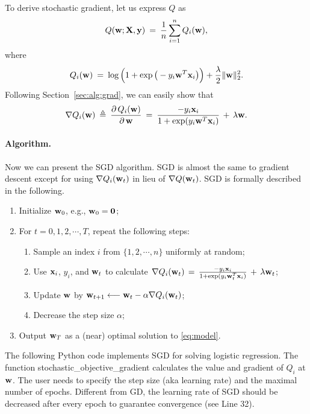 \documentclass[11pt]{article}
\numberwithin{equation}{section}
\def\w{{\bf w}}
\def\X{{\bf X}}
\def\x{{\bf x}}
\def\y{{\bf y}}
\def\0{{\bf 0}}
\begin{document}
To derive stochastic gradient, let us express $Q $ as 
\begin{equation}\label{eq:sgrad1}
Q (\w; \X, \y) \: = \: \frac{1}{n} \sum_{i=1}^n Q_i(\w)  ,
\end{equation}
where
\begin{equation*}
Q_i (\w) \: = \: \log \Big( 1 + \exp \big( - y_i \w^T \x_i \big) \Big) + \frac{\lambda}{2} \|\w \|_2^2 .
\end{equation*}
Following Section~\ref{sec:alg:grad}, we can easily show that
\begin{equation} \label{eq:sgrad2}
\nabla Q_i (\w) \: \triangleq \:
\frac{ \partial \, Q_i (\w ) }{\partial \, \w }
\: = \:
\frac{ - y_i \x_i }{1+\exp({y_i \w^T \x_i})} \, + \, \lambda \w .
\end{equation}


\paragraph{Algorithm.}
Now we can present the SGD algorithm.
SGD is almost the same to gradient descent except for using $\nabla Q_i (\w_t)$ in lieu of $\nabla Q (\w_t)$.
SGD is formally described in the following.
\begin{enumerate}
	\item 
	Initialize $\w_0$, e.g., $\w_0 = \0$;
	\item
	For $t = 0, 1, 2, \cdots , T$, repeat the following steps:
	\begin{enumerate}
		\item
		Sample an index $i$ from $\{ 1 , 2, \cdots , n \}$ uniformly at random;
		\item 
		Use $\x_i$, $y_i$, and $\w_t$ to calculate
		$\nabla Q_i (\w_t) \, = \, \frac{-  y_i \x_i }{1+\exp({y_i \w_t^T \x_i})} \, + \, \lambda \w_t $;
		\item
		Update $\w$ by
		$\w_{t+1} \longleftarrow \w_t - \alpha \nabla Q_i (\w_t)$;
		\item
		Decrease the step size $\alpha$;
	\end{enumerate}
	\item
	Output $\w_{T}$ as a (near) optimal solution to \eqref{eq:model}.
\end{enumerate}


The following Python code implements SGD for solving logistic regression.
The function \textsf{stochastic\_objective\_gradient} calculates the value and gradient of $Q_i$ at $\w$.
The user needs to specify the step size (aka learning rate) and the maximal number of epochs.
Different from GD, the learning rate of SGD should be decreased after every epoch to guarantee convergence (see Line 32).
\end{document}
